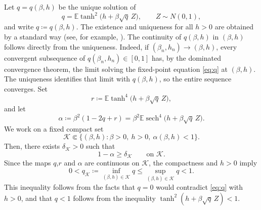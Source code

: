 \documentclass[11pt]{article}
\numberwithin{equation}{section}
\newcommand{\E}{\mathbb{E}}
\newcommand{\1}{\mathbf 1}
\newcommand{\sech}{\operatorname{sech}}
\newcommand{\cK}{\mathcal K}
\begin{document}
Let $q= q(\beta,h)$ be the unique solution of
\begin{equation}
 q=\E\tanh^2\bigl(h+\beta\sqrt q\,Z\bigr),
 \qquad Z\sim N(0,1),
 \label{eq:q}
\end{equation}
and write $q\coloneqq q(\beta,h)$.
The existence and uniqueness for all $h>0$ are obtained by a standard way (see, for example, \cite[Proposition~1.3.8]{Talagrand}).
The continuity of $q(\beta ,h )$ in $(\beta , h)$ follows directly from the uniqueness.
Indeed, if $(\beta_n,h_n)\to(\beta,h)$, every convergent subsequence of $q(\beta_n,h_n)\in[0,1]$ has, by the dominated convergence theorem, the limit solving the fixed-point equation \eqref{eq:q} at $(\beta,h)$.
The uniqueness identifies that limit with $q(\beta,h)$, so
the entire sequence converges.
Set
\begin{equation}
 r\coloneqq\E\tanh^4\bigl(h+\beta\sqrt q\,Z\bigr),
 \label{eq:ra}
\end{equation}
and let
\begin{equation}
 \alpha\coloneqq\beta^2(1-2q+r)
 =\beta^2\E\sech^4\bigl(h+\beta\sqrt q\,Z\bigr).
 \label{eq:alpha}
\end{equation}
We work on a fixed compact set
\begin{equation}
 \cK\Subset\{(\beta,h):\beta>0,\ h>0,\ \alpha(\beta,h)<1\}.
 \label{eq:K}
\end{equation}
Then, there exists $\delta_{\cK}>0$ such that
\begin{equation}
 1-\alpha\ge\delta_{\cK}
 \qquad\text{on }\cK.
 \label{eq:delta}
\end{equation}
Since the maps $q$,$r$ and $\alpha$ are continuous on $\cK$, the compactness and $h>0$ imply
\begin{equation}
 0<q_{\cK}\coloneqq\inf_{(\beta,h)\in\cK}q
 \le \sup_{(\beta,h)\in\cK}q<1.
 \label{eq:qcompact}
\end{equation}
This inequality follows from the facts that $q=0$ would contradict \eqref{eq:q} with $h>0$, and that $q<1$ follows from the inequality $\tanh^2(h+\beta\sqrt q\,Z)<1$.
\end{document}
